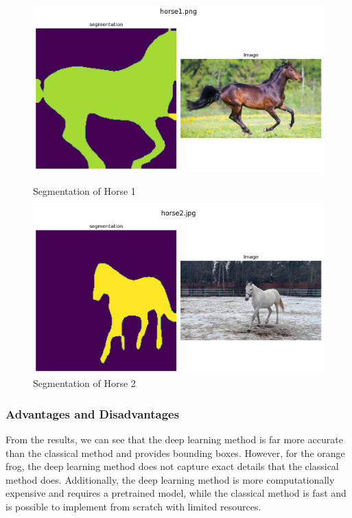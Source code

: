 \documentclass{article}
\begin{document}
\begin{figure}[h!]
    \centering
    \begin{minipage}{0.45\textwidth}
        \centering
        \includegraphics[width=\textwidth]{../output/1.2_rn3.png}
        \caption{Segmentation of Horse 1}
        \label{fig:1_2_resnet3}
    \end{minipage}
    \hfill
    \begin{minipage}{0.45\textwidth}
        \centering
        \includegraphics[width=\textwidth]{../output/1.2_rn4.png}
        \caption{Segmentation of Horse 2}
        \label{fig:1_2_resnet4}
    \end{minipage}
\end{figure}

\subsubsection*{Advantages and Disadvantages}

From the results, we can see that the deep learning method is far more accurate than the classical method and provides bounding boxes. However, for the orange frog, the deep learning method does not capture exact details that the classical method does. Additionally, the deep learning method is more computationally expensive and requires a pretrained model, while the classical method is fast and is possible to implement from scratch with limited resources.
\end{document}
